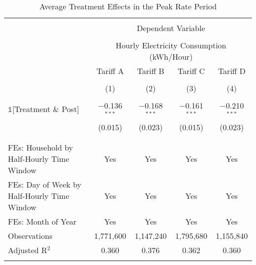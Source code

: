 
\begin{table}[!htbp] \centering 
  \caption{Average Treatment Effects in the Peak Rate Period} 
  \label{Table:Average-Treatment-Effects-in-the-Peak-Rate-Period} 
\small 
\begin{tabular}{@{\extracolsep{20pt}}lcccc} 
\\[-1.8ex]\hline 
\hline \\[-1.8ex] 
 & \multicolumn{4}{c}{Dependent Variable} \\ 
\cline{2-5} 
\\[-1.8ex] & \multicolumn{4}{c}{Hourly Electricity Consumption  (kWh/Hour)} \\ 
 & Tariff A & Tariff B & Tariff C & Tariff D \\ 
\\[-1.8ex] & (1) & (2) & (3) & (4)\\ 
\hline \\[-1.8ex] 
 $\mathbb{1}$[Treatment \& Post] & $-$0.136$^{***}$ & $-$0.168$^{***}$ & $-$0.161$^{***}$ & $-$0.210$^{***}$ \\ 
  & (0.015) & (0.023) & (0.015) & (0.023) \\ 
  & & & & \\ 
\hline \\[-1.8ex] 
FEs: Household by Half-Hourly Time Window & Yes & Yes & Yes & Yes \\ 
FEs: Day of Week by Half-Hourly Time Window & Yes & Yes & Yes & Yes \\ 
FEs: Month of Year & Yes & Yes & Yes & Yes \\ 
Observations & 1,771,600 & 1,147,240 & 1,795,680 & 1,155,840 \\ 
Adjusted R$^{2}$ & 0.360 & 0.376 & 0.362 & 0.360 \\ 
\hline 
\hline \\[-1.8ex] 
\end{tabular} 
\end{table} 
